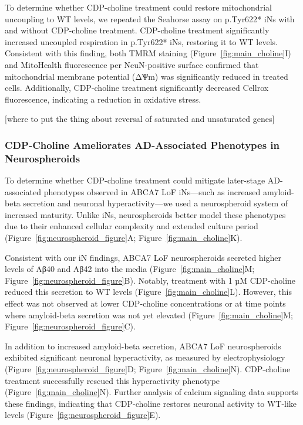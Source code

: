 To determine whether CDP-choline treatment could restore mitochondrial uncoupling to WT levels, we repeated the Seahorse assay on p.Tyr622* iNs with and without CDP-choline treatment. CDP-choline treatment significantly increased uncoupled respiration in p.Tyr622* iNs, restoring it to WT levels. Consistent with this finding, both TMRM staining (Figure~\ref{fig:main_choline}I) and MitoHealth fluorescence per NeuN-positive surface confirmed that mitochondrial membrane potential (ΔѰm) was significantly reduced in treated cells. Additionally, CDP-choline treatment significantly decreased Cellrox fluorescence, indicating a reduction in oxidative stress. 

[where to put the thing about reversal of saturated and unsaturated genes]

\subsubsection{CDP-Choline Ameliorates AD-Associated Phenotypes in Neurospheroids}
To determine whether CDP-choline treatment could mitigate later-stage AD-associated phenotypes observed in ABCA7 LoF iNs—such as increased amyloid-beta secretion and neuronal hyperactivity—we used a neurospheroid system of increased maturity. Unlike iNs, neurospheroids better model these phenotypes due to their enhanced cellular complexity and extended culture period (Figure~\ref{fig:neurospheroid_figure}A; Figure~\ref{fig:main_choline}K).

Consistent with our iN findings, ABCA7 LoF neurospheroids secreted higher levels of Aβ40 and Aβ42 into the media (Figure~\ref{fig:main_choline}M; Figure~\ref{fig:neurospheroid_figure}B). Notably, treatment with 1 µM CDP-choline reduced this secretion to WT levels (Figure~\ref{fig:main_choline}L). However, this effect was not observed at lower CDP-choline concentrations or at time points where amyloid-beta secretion was not yet elevated (Figure~\ref{fig:main_choline}M; Figure~\ref{fig:neurospheroid_figure}C).

In addition to increased amyloid-beta secretion, ABCA7 LoF neurospheroids exhibited significant neuronal hyperactivity, as measured by electrophysiology (Figure~\ref{fig:neurospheroid_figure}D; Figure~\ref{fig:main_choline}N). CDP-choline treatment successfully rescued this hyperactivity phenotype (Figure~\ref{fig:main_choline}N). Further analysis of calcium signaling data supports these findings, indicating that CDP-choline restores neuronal activity to WT-like levels (Figure~\ref{fig:neurospheroid_figure}E).

